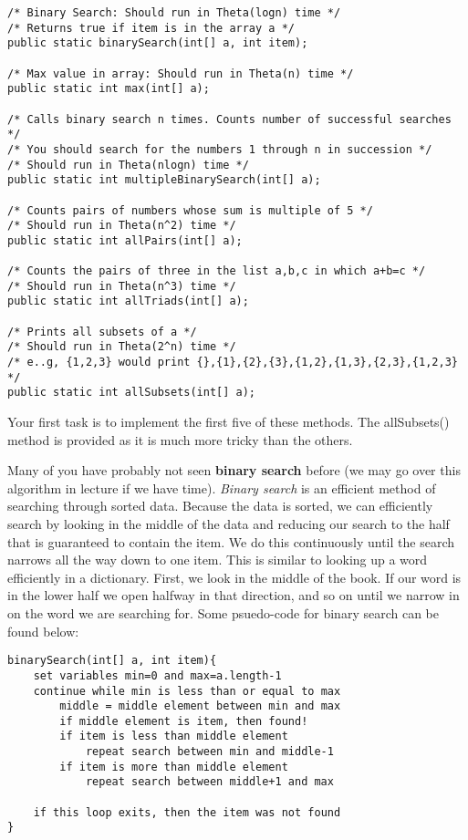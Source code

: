 \documentclass[paper=a4, fontsize=11pt, parskip=full]{scrartcl} %
\numberwithin{equation}{section} %
\numberwithin{figure}{section} %
\numberwithin{table}{section} %
\begin{document}
\begin{lstlisting}
/* Binary Search: Should run in Theta(logn) time */
/* Returns true if item is in the array a */
public static binarySearch(int[] a, int item);

/* Max value in array: Should run in Theta(n) time */
public static int max(int[] a);

/* Calls binary search n times. Counts number of successful searches */
/* You should search for the numbers 1 through n in succession */
/* Should run in Theta(nlogn) time */
public static int multipleBinarySearch(int[] a);

/* Counts pairs of numbers whose sum is multiple of 5 */
/* Should run in Theta(n^2) time */
public static int allPairs(int[] a);

/* Counts the pairs of three in the list a,b,c in which a+b=c */
/* Should run in Theta(n^3) time */
public static int allTriads(int[] a);

/* Prints all subsets of a */
/* Should run in Theta(2^n) time */
/* e..g, {1,2,3} would print {},{1},{2},{3},{1,2},{1,3},{2,3},{1,2,3} */
public static int allSubsets(int[] a);
\end{lstlisting}

Your first task is to implement the first five of these methods. The allSubsets() method is provided as it is much more tricky than the others.

Many of you have probably not seen \textbf{binary search} before (we may go over this algorithm in lecture if we have time). \emph{Binary search} is an efficient method of searching through sorted data. Because the data is sorted, we can efficiently search by looking in the middle of the data and reducing our search to the half that is guaranteed to contain the item. We do this continuously until the search narrows all the way down to one item. This is similar to looking up a word efficiently in a dictionary. First, we look in the middle of the book. If our word is in the lower half we open halfway in that direction, and so on until we narrow in on the word we are searching for. Some psuedo-code for binary search can be found below:

\begin{lstlisting}
binarySearch(int[] a, int item){
	set variables min=0 and max=a.length-1
	continue while min is less than or equal to max
		middle = middle element between min and max
		if middle element is item, then found!
		if item is less than middle element
			repeat search between min and middle-1
		if item is more than middle element
			repeat search between middle+1 and max

	if this loop exits, then the item was not found
}
\end{lstlisting}
\end{document}
